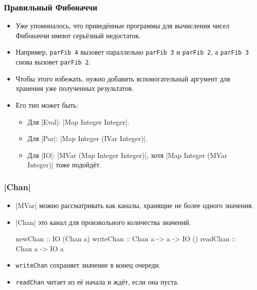\documentclass[11pt]{beamer}
\begin{document}
\begin{frame}[fragile]
  \frametitle{Правильный Фибоначчи}
  \begin{itemize}
    \item Уже упоминалось, что приведённые программы для вычисления чисел Фибоначчи имеют серьёзный недостаток.
    \item Например, \lstinline|parFib 4| вызовет параллельно \lstinline|parFib 3| и \lstinline|parFib 2|, а \lstinline|parFib 3| снова вызовет \lstinline|parFib 2|.
    \item Чтобы этого избежать, нужно добавить вспомогательный аргумент для хранения уже полученных результатов.
    \item Его тип может быть:
          \begin{itemize}
            \item Для \haskinline|Eval|: \haskinline|Map Integer Integer|.
            \item Для \haskinline|Par|: \haskinline|Map Integer (IVar Integer)|.
            \item Для \haskinline|IO|: \haskinline|MVar (Map Integer Integer)|, хотя \haskinline|Map Integer (MVar Integer)| тоже подойдёт.
          \end{itemize}
  \end{itemize}
\end{frame}

\begin{frame}[fragile]
  \frametitle{\haskinline|Chan|}
  \begin{itemize}
    \item \haskinline|MVar| можно рассматривать как каналы, хранящие не более одного значения.
    \item \haskinline|Chan| это канал для произвольного количества значений.
          \begin{haskell}
        newChan :: IO (Chan a)
        writeChan :: Chan a -> a -> IO () 
        readChan :: Chan a -> IO a
    \end{haskell}
    \item \lstinline|writeChan| сохраняет значение в конец очереди.
    \item \lstinline|readChan| читает из её начала и ждёт, если она пуста.
  \end{itemize}
\end{frame}
\end{document}
